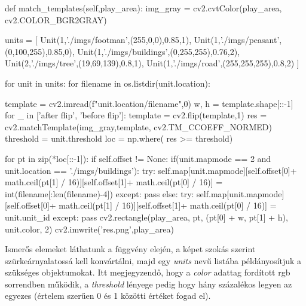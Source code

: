 \begin{python}
def match_templates(self,play_area):
    img_gray = cv2.cvtColor(play_area, cv2.COLOR_BGR2GRAY)

    units = [
            Unit(1,'./imgs/footman',(255,0,0),0.85,1),
            Unit(1,'./imgs/peasant',(0,100,255),0.85,0),
            Unit(1,'./imgs/buildings',(0,255,255),0.76,2),
            Unit(2,'./imgs/tree',(19,69,139),0.8,1),
            Unit(1,'./imgs/road',(255,255,255),0.8,2)
            ]

    for unit in units:
        for filename in os.listdir(unit.location):
            
            template = cv2.imread(f"{unit.location}/{filename}",0)
            w, h = template.shape[::-1]
            for _ in ['after flip', 'before flip']:
                template = cv2.flip(template,1)
                res = cv2.matchTemplate(img_gray,template,
                cv2.TM_CCOEFF_NORMED)
                threshold = unit.threshold
                loc = np.where( res >= threshold)

                for pt in zip(*loc[::-1]):
                    if self.offset != None:
                        if(unit.mapmode == 2 and 
                            unit.location == './imgs/buildings'):
                            try:
                                self.map[unit.mapmode][self.offset[0]+
                                math.ceil(pt[1] / 16)][self.offset[1]+
                                math.ceil(pt[0] / 16)] = 
                                int(filename[:len(filename)-4])
                            except:
                                pass
                        else:
                            try:
                                self.map[unit.mapmode][self.offset[0]+
                                math.ceil(pt[1] / 16)][self.offset[1]+
                                math.ceil(pt[0] / 16)] = unit.unit_id
                            except:
                                pass
                    cv2.rectangle(play_area, pt, (pt[0] + w, pt[1] + h),
                                unit.color, 2)
                    cv2.imwrite('res.png',play_area)
\end{python}

Ismerős elemeket láthatunk a függvény elején, a képet szokás szerint szürkeárnyalatossá kell konvártálni, majd egy \textit{units} nevű listába példányosítjuk a szükséges objektumokat. Itt megjegyzendő, hogy a \textit{color} adattag fordított rgb sorrendben működik, a \textit{threshold} lényege pedig hogy hány százalékos legyen az egyezes (értelem szerűen 0 és 1 közötti értéket fogad el).

